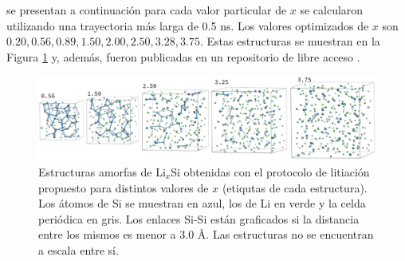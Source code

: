 se presentan a continuación para cada valor particular de $x$ se calcularon 
utilizando una trayectoria más larga de 0.5 ns. Los valores optimizados de $x$
son $0.20, 0.56, 0.89, 1.50, 2.00, 2.50, 3.28, 3.75$. Estas estructuras se 
muestran en la Figura \ref{fig:litiacion} y, además, fueron publicadas en un 
repositorio de libre acceso \cite{dftb_lisi_amorphous}.
\begin{figure}[h!]
    \centering
    \includegraphics[width=\textwidth]{Silicio/prediccion/metodos/litiacion.png}
    \caption{Estructuras amorfas de Li$_x$Si obtenidas con el protocolo de litiación
    propuesto para distintos valores de $x$ (etiqutas de cada estructura). Los 
    átomos de Si se muestran en azul, los de Li en verde y la celda periódica en 
    gris. Los enlaces Si-Si están graficados si la distancia entre los mismos es
    menor a 3.0 \AA. Las estructuras no se encuentran a escala entre sí.}
    \label{fig:litiacion}
\end{figure}
